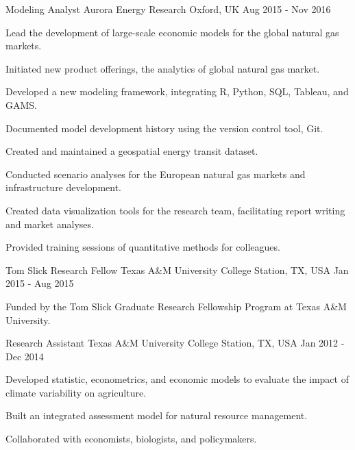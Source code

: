 \begin{cventries}
    \cventry
    {Modeling Analyst} %
    {Aurora Energy Research} %
    {Oxford, UK} %
    {Aug 2015 - Nov 2016} %
    {
        \begin{cvitems} %
            \item {Lead the development of large-scale economic models for the global natural gas markets.}
            \item {Initiated new product offerings, the analytics of global natural gas market.}
            \item {Developed a new modeling framework, integrating R, Python, SQL, Tableau, and GAMS.}
            \item {Documented model development history using the version control tool, Git.}
            \item {Created and maintained a geospatial energy transit dataset.}
            \item {Conducted scenario analyses for the European natural gas markets and infrastructure development.}
            \item {Created data visualization tools for the research team, facilitating report writing and market analyses.}
            \item {Provided training sessions of quantitative methods for colleagues.}
        \end{cvitems}
    }

    \cventry
    {Tom Slick Research Fellow} %
    {Texas A\&M University} %
    {College Station, TX, USA} %
    {Jan 2015 - Aug 2015} %
    {
        \begin{cvitems} %
            \item {Funded by the Tom Slick Graduate Research Fellowship Program at Texas A\&M University.}
        \end{cvitems}
    }

    \cventry
    {Research Assistant} %
    {Texas A\&M University} %
    {College Station, TX, USA} %
    {Jan 2012 - Dec 2014} %
    {
        \begin{cvitems} %
            \item {Developed statistic, econometrics, and economic models to evaluate the impact of climate variability on agriculture.}
            \item {Built an integrated assessment model for natural resource management.}
            \item {Collaborated with economists, biologists, and policymakers.}
        \end{cvitems}
    }


\end{cventries}

